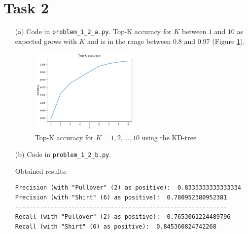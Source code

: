 \documentclass [a4paper, 11pt] {article}
\begin{document}
\section{Task 2}
\begin{enumerate}
	\item[(a)] Code in \texttt{problem\_1\_2\_a.py}. Top-K accuracy for $K$ between $1$ and $10$ as expected grows with $K$ and is in the range between $0.8$ and $0.97$ (Figure \ref{fig:2a}).
	\begin{figure}[!h]
		\centering
		\includegraphics[width=0.5\textwidth]{1_2_a.png}
		\caption{Top-K accuracy for $K = 1, 2,\dots, 10$ using the KD-tree}
		\label{fig:2a}
	\end{figure}

	\item[(b)]	Code in \texttt{problem\_1\_2\_b.py}.
	
	Obtained results:
	\begin{lstlisting}[mathescape=true]
Precision (with "Pullover" (2) as positive):  0.8333333333333334
Precision (with "Shirt" (6) as positive):  0.780952380952381
------------------------------------------------------------
Recall (with "Pullover" (2) as positive):  0.7653061224489796
Recall (with "Shirt" (6) as positive):  0.845360824742268
	\end{lstlisting}
	
\end{enumerate}
	
	
	

	
\end{document}
